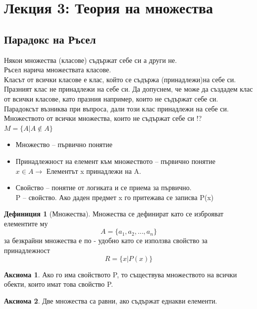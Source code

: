 \documentclass[fleqn, 12pt]{article}
\theoremstyle{definition}
\newtheorem{definition}{Дефиниция}[subsection]
\newtheorem{axiom}{Аксиома}[subsection]
\begin{document}
\newpage

\section{Лекция 3: Теория на множества}

\subsection{Парадокс на Ръсел}
Някои множества (класове) съдържат себе си а други не.\\
Ръсел нарича множествата класове.\\
Класът от всички класове е клас, който се съдържа (принадлежи)на себе си. Празният клас не принадлежи на себе си. Да допуснем, че може да създадем клас от всички класове, като празния например, които не съдържат себе си.\\
Парадоксът възниква при въпроса, дали този клас принадлежи на себе си. \\
Множеството от всички множества, които не съдържат себе си !? \\
$M = \{ A | A \notin A \}$\\
\begin{itemize}
	\item Множество – първично понятие
	\item Принадлежност на елемент към множеството – първично понятие \\
$x\in A \to$ Елементът x принадлежи на A.
	\item Свойство – понятие от логиката и се приема за първично. \\
P – свойство. Ако даден предмет x го притежава се записва P(x)
\end{itemize}

\begin{definition}[Множества]
Множества се дефинират като се изброяват елементите му 
$$A = \{ a_1, a_2, ..., a_n\}$$
за безкрайни множества е по - удобно като се използва свойство за принадлежност 
$$R = \{x | P(x) \} $$
\end{definition}

\begin{axiom}
Ако го има свойството P, то съществува множеството на всички обекти, които имат това свойство P.
\end{axiom}

\begin{axiom}
Две множества са равни, ако съдържат еднакви елементи.
\end{axiom}
\end{document}
